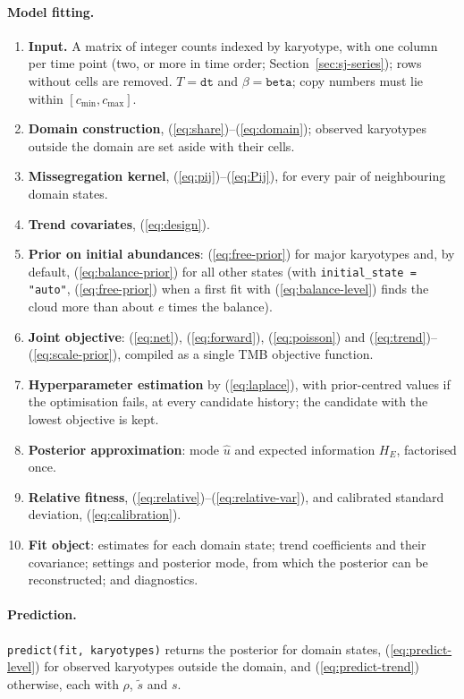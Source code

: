 \documentclass[11pt]{article}
\begin{document}
\paragraph{Model fitting.}
\begin{enumerate}
\item \textbf{Input.} A matrix of integer counts indexed by karyotype, with
one column per time point (two, or more in time order;
Section~\ref{sec:sj-series}); rows without cells are removed.
$T=\texttt{dt}$ and $\beta=\texttt{beta}$; copy numbers must lie within
$[c_{\min},c_{\max}]$.
\item \textbf{Domain construction}, (\ref{eq:share})--(\ref{eq:domain});
observed karyotypes outside the domain are set aside with their cells.
\item \textbf{Missegregation kernel}, (\ref{eq:pij})--(\ref{eq:Pij}), for
every pair of neighbouring domain states.
\item \textbf{Trend covariates}, (\ref{eq:design}).
\item \textbf{Prior on initial abundances}: (\ref{eq:free-prior}) for major
karyotypes and, by default, (\ref{eq:balance-prior}) for all other states
(with \texttt{initial\_state = "auto"}, (\ref{eq:free-prior}) when a first fit
with (\ref{eq:balance-level}) finds the cloud more than about $e$ times the
balance).
\item \textbf{Joint objective}: (\ref{eq:net}), (\ref{eq:forward}),
(\ref{eq:poisson}) and (\ref{eq:trend})--(\ref{eq:scale-prior}), compiled as a
single TMB objective function.
\item \textbf{Hyperparameter estimation} by (\ref{eq:laplace}), with
prior-centred values if the optimisation fails, at every candidate history;
the candidate with the lowest objective is kept.
\item \textbf{Posterior approximation}: mode $\hat u$ and expected information
$H_E$, factorised once.
\item \textbf{Relative fitness}, (\ref{eq:relative})--(\ref{eq:relative-var}),
and calibrated standard deviation, (\ref{eq:calibration}).
\item \textbf{Fit object}: estimates for each domain state; trend coefficients
and their covariance; settings and posterior mode, from which the posterior
can be reconstructed; and diagnostics.
\end{enumerate}

\paragraph{Prediction.}
\texttt{predict(fit, karyotypes)} returns the posterior for domain states,
(\ref{eq:predict-level}) for observed karyotypes outside the domain, and
(\ref{eq:predict-trend}) otherwise, each with $\rho$, $\tilde s$ and $s$.
\end{document}
